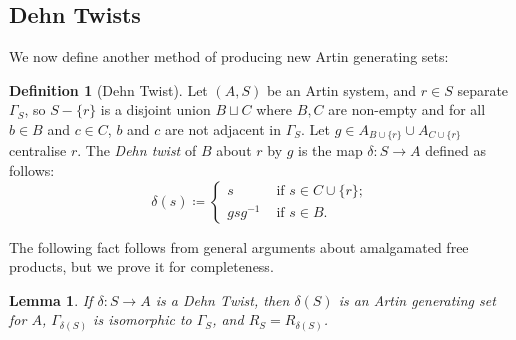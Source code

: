 \documentclass[svgnames]{amsart}
\theoremstyle{plain}
\newtheorem{lemma}[thm]{Lemma}
\theoremstyle{definition}
\newtheorem{defn}[thm]{Definition}
\begin{document}
\subsection{Dehn Twists}
We now define another method of producing new Artin generating sets:
\begin{defn}[Dehn Twist]\label{defn:dehn_twist}
    Let $(A,S)$ be an Artin system, and $r \in S$ separate $\Gamma_S$, so $S - \{r\}$ is a disjoint union $B \sqcup C$ where $B, C$ are non-empty and for all $b \in B$ and $c \in C$, $b$ and $c$ are not adjacent in $\Gamma_S$. Let $g\in A_{B\cup \{r\}}\cup A_{C\cup \{r\}}$ centralise $r$. The \emph{Dehn twist} of $B$ about $r$ by $g$ is the map $\delta\colon S \rightarrow A$ defined as follows: $$\delta(s)\coloneq\begin{cases}
        s & \mbox{ if }s\in C\cup\{r\};\\
        g s g^{-1} & \mbox{ if }s\in B.
    \end{cases}$$
\end{defn}


\noindent The following fact follows from general arguments about amalgamated free products, but we prove it for completeness.
\begin{lemma}\label{lem:dehntwistpreservesgraph}
    If $\delta\colon S\to A$ is a Dehn Twist, then $\delta(S)$ is an Artin generating set for $A$, $\Gamma_{\delta(S)}$ is isomorphic to $\Gamma_{S}$, and $R_S=R_{\delta(S)}$.
\end{lemma}
\end{document}
